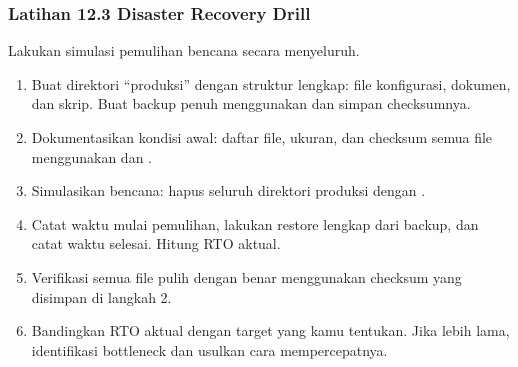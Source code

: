 \subsubsection*{Latihan 12.3 Disaster Recovery Drill}
Lakukan simulasi pemulihan bencana secara menyeluruh.
\begin{enumerate}
    \item Buat direktori ``produksi'' dengan struktur lengkap: file konfigurasi,
        dokumen, dan skrip. Buat backup penuh menggunakan  dan simpan
        checksumnya.
    \item Dokumentasikan kondisi awal: daftar file, ukuran, dan checksum semua
        file menggunakan  dan .
    \item Simulasikan bencana: hapus seluruh direktori produksi dengan .
    \item Catat waktu mulai pemulihan, lakukan restore lengkap dari backup, dan
        catat waktu selesai. Hitung RTO aktual.
    \item Verifikasi semua file pulih dengan benar menggunakan checksum yang
        disimpan di langkah 2.
\item Bandingkan RTO aktual dengan target yang kamu tentukan. Jika lebih lama,
        identifikasi bottleneck dan usulkan cara mempercepatnya.
\end{enumerate}

